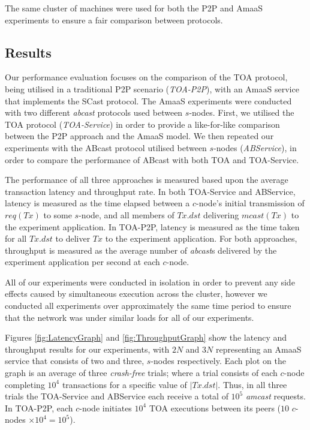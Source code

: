 	The same cluster of machines were used for both the P2P and \textsf{AmaaS} experiments to ensure a fair comparison between protocols.   
	
	\subsection{Results}\label{sec:AmaaS_results}
	Our performance evaluation focuses on the comparison of the TOA protocol, being utilised in a traditional P2P scenario (\emph{TOA-P2P}), with an \textsf{AmaaS} service that implements the \textsf{SCast} protocol.  The \textsf{AmaaS} experiments were conducted with two different \emph{abcast} protocols used between $s$-nodes.  First, we utilised the TOA protocol (\emph{TOA-Service}) in order to provide a like-for-like comparison between the P2P approach and the \textsf{AmaaS} model. We then repeated our experiments with the \textsf{ABcast} protocol utilised between $s$-nodes (\emph{ABService}), in order to compare the performance of \textsf{ABcast} with both TOA and TOA-Service.  
    
    The performance of all three approaches is measured based upon the average transaction latency and throughput rate. In both TOA-Service and ABService, latency is measured as the time elapsed between a $c$-node's initial transmission of $req(Tx)$ to some $s$-node, and all members of $Tx.dst$ delivering $mcast(Tx)$ to the experiment application. In TOA-P2P, latency is measured as the time taken for all $Tx.dst$ to deliver $Tx$ to the experiment application. For both approaches, throughput is measured as the average number of \emph{abcast}s delivered by the experiment application per second at each $c$-node.
	
	All of our experiments were conducted in isolation in order to prevent any side effects caused by simultaneous execution across the cluster, however we conducted all experiments over approximately the same time period to ensure that the network was under similar loads for all of our experiments. 
	
	Figures \ref{fig:LatencyGraph} and \ref{fig:ThroughputGraph} show the latency and throughput results for our experiments, with $2N$ and $3N$ representing an \textsf{AmaaS} service that consists of two and three, $s$-nodes respectively.  Each plot on the graph is an average of three \emph{crash-free} trials; where a trial consists of each $c$-node completing $10^4$ transactions for a specific value of $|Tx.dst|$. Thus, in all three trials the TOA-Service and ABService each receive a total of $10^5$ \emph{amcast} requests. In TOA-P2P, each $c$-node initiates $10^4$ TOA executions between its peers ($10$ $c$-nodes $\times 10^4 = 10^5$).  
	
